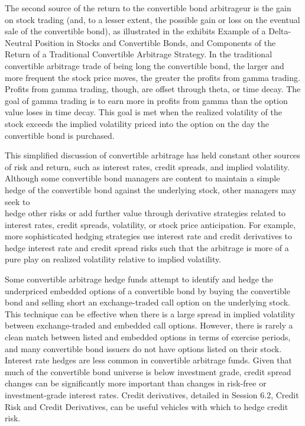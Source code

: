 \documentclass[11pt]{article}
\begin{document}
The second source of the return to the convertible bond arbitrageur is the gain on stock trading (and, to a lesser extent, the possible gain or loss on the eventual sale of the convertible bond), as illustrated in the exhibits Example of a Delta-Neutral Position in Stocks and Convertible Bonds, and Components of the Return of a Traditional Convertible Arbitrage Strategy. In the traditional convertible arbitrage trade of being long the convertible bond, the larger and more frequent the stock price moves, the greater the profits from gamma trading. Profits from gamma trading, though, are offset through theta, or time decay. The goal of gamma trading is to earn more in profits from gamma than the option value loses in time decay. This goal is met when the realized volatility of the stock exceeds the implied volatility priced into the option on the day the convertible bond is purchased.

This simplified discussion of convertible arbitrage has held constant other sources of risk and return, such as interest rates, credit spreads, and implied volatility. Although some convertible bond managers are content to maintain a simple hedge of the convertible bond against the underlying stock, other managers may seek to\\
hedge other risks or add further value through derivative strategies related to interest rates, credit spreads, volatility, or stock price anticipation. For example, more sophisticated hedging strategies use interest rate and credit derivatives to hedge interest rate and credit spread risks such that the arbitrage is more of a pure play on realized volatility relative to implied volatility.

Some convertible arbitrage hedge funds attempt to identify and hedge the underpriced embedded options of a convertible bond by buying the convertible bond and selling short an exchange-traded call option on the underlying stock. This technique can be effective when there is a large spread in implied volatility between exchange-traded and embedded call options. However, there is rarely a clean match between listed and embedded options in terms of exercise periods, and many convertible bond issuers do not have options listed on their stock. Interest rate hedges are less common in convertible arbitrage funds. Given that much of the convertible bond universe is below investment grade, credit spread changes can be significantly more important than changes in risk-free or investment-grade interest rates. Credit derivatives, detailed in Session 6.2, Credit Risk and Credit Derivatives, can be useful vehicles with which to hedge credit risk.
\end{document}
